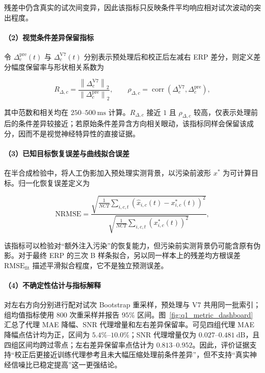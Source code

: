 \documentclass[a4paper]{ctexart}
\numberwithin{figure}{section}       %
\begin{document}
残差中仍含真实的试次间变异，因此该指标只反映条件平均响应相对试次波动的突出程度。

\paragraph{（2）视觉条件差异保留指标}

令 $\Delta_c^{\mathrm{pre}}(t)$ 与 $\Delta_c^{\mathrm{V7}}(t)$ 分别表示预处理后和校正后左减右 ERP 差分，则定义差分幅度保留率与形状相关系数为

\begin{equation}
    R_{\Delta,c}=
    \frac{\left\|\Delta_c^{\mathrm{V7}}\right\|_2}
    {\left\|\Delta_c^{\mathrm{pre}}\right\|_2},
    \qquad
    \rho_{\Delta,c}=\operatorname{corr}
    \left(\Delta_c^{\mathrm{V7}},\Delta_c^{\mathrm{pre}}\right),
    \label{eq:q1_retention}
\end{equation}

其中范数和相关均在 $250$--$500~\mathrm{ms}$ 计算。$R_{\Delta,c}$ 接近 $1$ 且 $\rho_{\Delta,c}$ 较高，仅表示处理前后的条件差异较接近；若原始条件差异含方向相关眼动，该指标同样会保留该成分，因而不是视觉神经特异性的直接证据。

\paragraph{（3）已知目标恢复误差与曲线拟合误差}

在半合成检验中，将人工伪影加入预处理实测背景，以污染前波形 $x^{\ast}$ 为可计算目标。归一化恢复误差定义为

\begin{equation}
    \mathrm{NRMSE}=
    \frac{\sqrt{\frac{1}{NCT}\sum_{i,c,t}\left(\hat{x}_{i,c}(t)-x^{\ast}_{i,c}(t)\right)^2}}
    {\sqrt{\frac{1}{NCT}\sum_{i,c,t}\left(x^{\ast}_{i,c}(t)\right)^2}},
    \label{eq:q1_nrmse}
\end{equation}

该指标可以检验对“额外注入污染”的恢复能力，但污染前实测背景仍可能含原有伪影。对于最终 ERP 的三次 B 样条拟合，另以同一样本上的残差均方根误差 $\mathrm{RMSE}_{\mathrm{fit}}$ 描述平滑拟合程度，它不是独立预测误差。

\paragraph{（4）不确定性估计与指标解释}

对左右方向分别进行配对试次 Bootstrap 重采样，预处理与 V7 共用同一批索引；组均值指标使用 $800$ 次重采样并报告 $95\%$ 区间。图~\ref{fig:q1_metric_dashboard} 汇总了代理 MAE 降幅、SNR 代理增量和左右差异保留率。可见四组代理 MAE 降幅点估计均为正，区间为 $5.4\%$--$10.0\%$；SNR 代理增量仅为 $0.027$--$0.481~\mathrm{dB}$，且四组区间均跨过零点；左右差异保留率点估计为 $0.813$--$0.952$。因此，评价证据支持“校正后更接近训练代理参考且未大幅压缩处理前条件差异”，但不支持“真实神经信噪比已稳定提高”这一更强结论。
\end{document}
